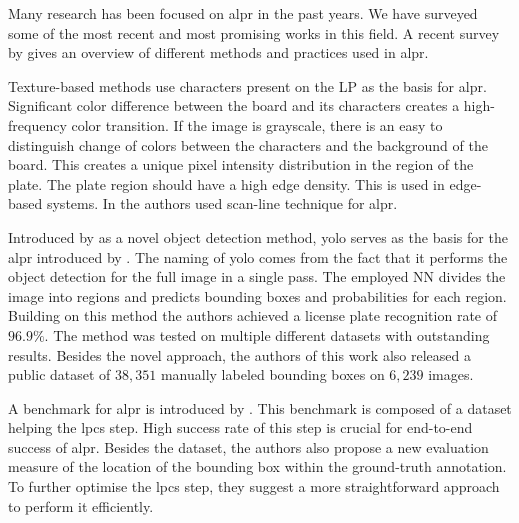 \label{previous-solutions}
Many research has been focused on \ac{alpr} in the past years.
We have surveyed some of the most recent and most promising works in this field.
A recent survey by \cite{survOnMet} gives an overview of different methods and
practices used in \ac{alpr}.

Texture-based methods use characters present on the \ac{LP} as the basis for
\ac{alpr}. Significant color difference between the board and its characters
creates a high-frequency color transition. If the image is grayscale,
there is an easy to distinguish change of colors between the characters and the
background of the board. This creates a unique pixel intensity distribution in
the region of the plate. The plate region should have a high edge density. This
is used in edge-based systems. In \cite{HongFuJiaHuan} the authors used
scan-line technique for \ac{alpr}.

Introduced by \cite{redmon2016look} as a novel object detection method,
\ac{yolo} serves as the basis for the \ac{alpr} introduced by
\cite{DBLP:journals/corr/abs-1909-01754}.
The naming of \ac{yolo} comes from the fact that it performs the object detection
for the full image in a single pass. The employed \ac{NN} divides the image
into regions and predicts bounding boxes and probabilities for each region.
Building on this method the authors achieved a license plate recognition rate of
$96.9\%$.  The method was tested on multiple different datasets with outstanding
results.  Besides the novel approach, the authors of this work also released
a public dataset of $38,351$ manually labeled bounding boxes on $6,239$ images.

A benchmark for \ac{alpr} is introduced by
\cite{DBLP:journals/corr/GoncalvesSMS16}. This benchmark is
composed of a dataset helping the \ac{lpcs} step. High success rate of this step
is crucial for end-to-end success of \ac{alpr}. Besides the dataset, the authors
also propose a new evaluation measure of the location of the bounding
box within the ground-truth annotation. To further optimise the \ac{lpcs} step,
they suggest a more straightforward approach to perform it efficiently.

